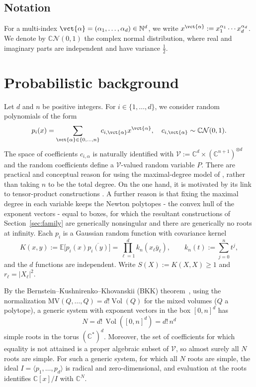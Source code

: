 \documentclass[12pt]{article}
\def\E{\mathbb{E}}
\def\C{\mathbb{C}}
\def\N{\mathbb{N}}
\def\CN{\mathbb{C}\mathcal{N}}
\DeclareMathOperator{\Vol}{Vol}
\begin{document}
\subsection{Notation}
For a multi-index $\vct{\alpha} = (\alpha_1, \dots, \alpha_d) \in \N^d$, we write $x^{\vct{\alpha}} := x_1^{\alpha_1} \cdots x_d^{\alpha_d}$. We denote by $\CN(0,1)$ the complex normal distribution, where real and imaginary parts are independent and have variance $\frac12$.

\section{Probabilistic background}
Let $d$ and $n$ be positive integers. For $i\in \{1,\dots,d\}$, we consider random polynomials of the form
\begin{equation}\label{eq:poly-model}
  p_i(x) = \sum_{\vct{\alpha}\in \{0,\dots,n\}} c_{i,\vct{\alpha}} x^{\vct{\alpha}}, \quad c_{i,\vct{\alpha}} \sim \CN(0,1).
\end{equation}
The space of coefficients $c_{i,\alpha}$ is naturally identified with $\mathcal{V}:=\C^{d}\times (\C^{n+1})^{\otimes d}$ and the random coefficients define a $\mathcal{V}$-valued random variable $P$. 
There are practical and conceptual reason for using the maximal-degree model of \cite{noferini2016numerical}, 
rather than taking $n$ to be the total degree. 
On the one hand, it is motivated by its
link to tensor-product constructions \cite[Sec.~2.1]{noferini2016numerical}. A further reason
is that fixing the maximal degree in each variable
keeps the Newton polytopes - the convex hull of the exponent vectors - equal to boxes, for which the resultant constructions of
Section~\ref{sec:family} are generically nonsingular and there are generically no roots at
infinity. Each $p_i$ is a Gaussian random function with covariance kernel
\begin{equation}\label{eq:kernel}
  K(x,y) := \E\bigl[p_i(x)\overline{p_i(y)}\bigr] = \prod_{\ell=1}^d k_n(x_\ell\bar y_\ell),
  \qquad k_n(t):=\sum_{j=0}^n t^j,
\end{equation}
and the $d$ functions are independent. Write $S(X):=K(X,X)\ge1$ and $r_\ell=|X_\ell|^2$.

By the Bernstein--Kushnirenko--Khovanskii (BKK) theorem~\cite{bernstein1975roots}, using the
normalization $\mathrm{MV}(Q,\dots,Q)=d!\Vol(Q)$ for the mixed volumes ($Q$ a polytope), a generic system with exponent vectors in the box $[0,n]^d$ has
\begin{equation}\label{eq:count}
  N = d!\,\Vol([0,n]^d) = d!\,n^d
\end{equation}
simple roots in the torus $(\C^*)^d$. Moreover, the set of coefficients for which equality is not attained is a proper algebraic subset of $\mathcal{V}$, so almost surely all $N$ roots are simple. 
For such a generic system, for which all $N$ roots are simple, the ideal $I=\langle p_1,\dots,p_d\rangle$ is radical and zero-dimensional, and evaluation at the roots identifies $\C[x]/I$ with $\C^N$. 
\end{document}
